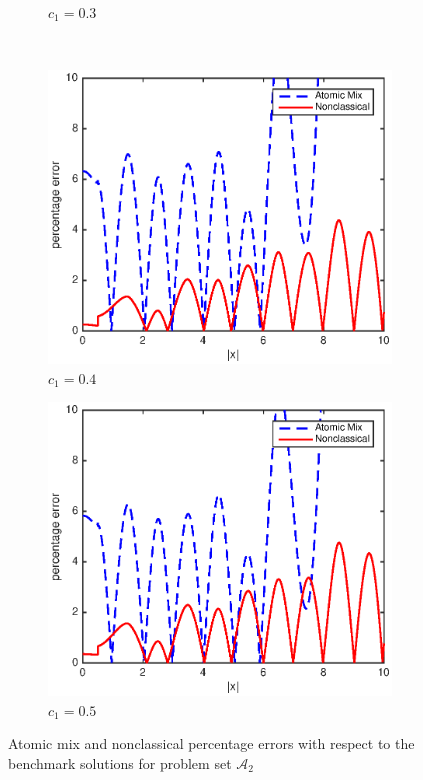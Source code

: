 \documentclass[12pt]{article}
\newcommand{\seta}{\mathcal{A}}
\begin{document}
{\begin{figure}[p]
\begin{subfigure}{0.495\textwidth}
        \caption{$c_1 = 0.3$}
        \label{figerrB30}
    \end{subfigure}
    \\
    \centering
    \begin{subfigure}{0.495\textwidth}
        \centering
        \includegraphics[width=\textwidth]{NSE_err_B40.eps}
        \caption{$c_1 = 0.4$}
        \label{figerrB40}
    \end{subfigure}
    \hfill
    \begin{subfigure}{0.495\textwidth}
        \centering
        \includegraphics[width=\textwidth]{NSE_err_B50.eps}
        \caption{$c_1 = 0.5$}
        \label{figerrB50}
    \end{subfigure}
    \caption{Atomic mix and nonclassical percentage errors with respect to the benchmark solutions for problem set $\seta_2$}
    \label{figerrB1}
\end{figure}





}
\end{document}
